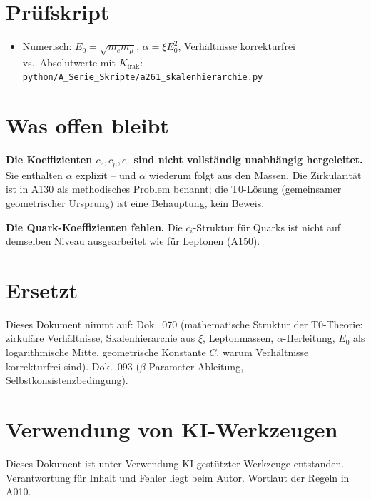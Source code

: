 \section{Prüfskript}

\begin{itemize}[leftmargin=2em,itemsep=2pt,topsep=2pt]
  \item Numerisch: $E_0=\sqrt{m_em_\mu}$, $\alpha=\xi E_0^2$, Verhältnisse
    korrekturfrei vs.\ Absolutwerte mit $K_\text{frak}$:
    \texttt{python/A\_Serie\_Skripte/a261\_skalenhierarchie.py}
\end{itemize}

\section{Was offen bleibt}

\textbf{Die Koeffizienten $c_e,c_\mu,c_\tau$ sind nicht vollständig unabhängig
hergeleitet.} Sie enthalten $\alpha$ explizit -- und $\alpha$ wiederum folgt aus den
Massen. Die Zirkularität ist in A130 als methodisches Problem benannt; die T0-Lösung
(gemeinsamer geometrischer Ursprung) ist eine Behauptung, kein Beweis.

\textbf{Die Quark-Koeffizienten fehlen.} Die $c_i$-Struktur für Quarks ist nicht
auf demselben Niveau ausgearbeitet wie für Leptonen (A150).

\section{Ersetzt}

Dieses Dokument nimmt auf: Dok.~070 (mathematische Struktur der T0-Theorie:
zirkuläre Verhältnisse, Skalenhierarchie aus $\xi$, Leptonmassen, $\alpha$-Herleitung,
$E_0$ als logarithmische Mitte, geometrische Konstante $C$, warum Verhältnisse
korrekturfrei sind). Dok.~093 ($\beta$-Parameter-Ableitung, Selbstkonsistenzbedingung).

\section{Verwendung von KI-Werkzeugen}

Dieses Dokument ist unter Verwendung KI-gestützter Werkzeuge entstanden. Verantwortung
für Inhalt und Fehler liegt beim Autor. Wortlaut der Regeln in A010.

